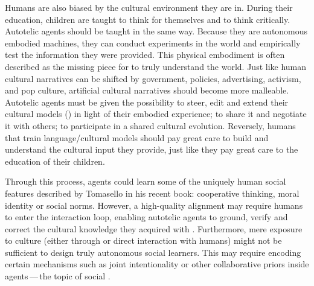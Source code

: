 Humans are also biased by the cultural environment they are in. During their education, children are taught to think for themselves and to think critically. Autotelic agents should be taught in the same way. Because they are autonomous embodied machines, they can conduct experiments in the world and empirically test the information they were provided. This physical embodiment is often described as the missing piece for \llms to truly understand the world.\cite{bisk2020experience} Just like human cultural narratives can be shifted by government, policies, advertising, activism, and pop culture, artificial cultural narratives should become more malleable. Autotelic agents must be given the possibility to steer, edit and extend their cultural models (\ie \llms) in light of their embodied experience; to share it and negotiate it with others; \ie to participate in a shared cultural evolution. Reversely, humans that train language/cultural models should pay great care to build and understand the cultural input they provide, just like they pay great care to the education of their children. 

Through this process, agents could learn some of the uniquely human social features described by Tomasello in his recent book\cite{Tomasello+2019}: cooperative thinking, moral identity or social norms. However, a high-quality alignment may require humans to enter the interaction loop, enabling autotelic agents to ground, verify and correct the cultural knowledge they acquired with \llms. Furthermore, mere exposure to culture (either through \llms or direct interaction with humans) might not be sufficient to design truly autonomous social learners. This may require encoding certain mechanisms such as joint intentionality or other collaborative priors inside agents\,---\,the topic of social \rl.\cite{jaques2019social}



